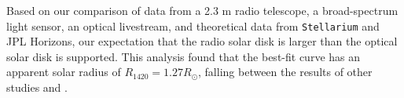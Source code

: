 Based on our comparison of data from a 2.3 m radio telescope, a broad-spectrum light sensor, an optical livestream, and theoretical data from \texttt{Stellarium} and JPL Horizons, our expectation that the radio solar disk is larger than the optical solar disk is supported.
This analysis found that the best-fit curve has an apparent solar radius of $R_{\mathrm{1420}} = 1.27 R_{\odot}$, falling between the results of other studies \cite{messerotti_radio_2000} and \cite{leung_solar_2022}.

